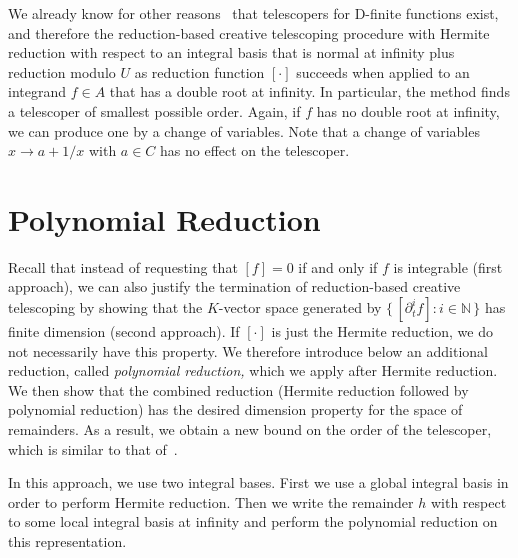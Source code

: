 \documentclass[final,1p,times,authoryear]{elsarticle}
\let\set\mathbb
\begin{document}
We already know for other reasons~\citep{Zeilberger1990,chyzak00} that
telescopers for D-finite functions exist, and therefore the reduction-based
creative telescoping procedure with Hermite reduction with respect to an
integral basis that is normal at infinity plus reduction modulo $U$
as reduction function $[\cdot]$ succeeds when applied to an integrand $f\in A$ that has a double root at infinity.
In particular, the method finds a telescoper of smallest possible order.
Again, if $f$ has no double root at infinity, we can produce one by a change of variables.
Note that a change of variables $x\to a+1/x$ with $a\in C$ has no effect on
the telescoper.

\section{Polynomial Reduction}\label{sec:polynomial}

Recall that instead of requesting that $[f]=0$ if and only if $f$ is integrable
(first approach), we can also justify the termination of reduction-based
creative telescoping by showing that the $K$-vector space generated by $\bigl\{\,[\partial_t^if]:i\in\set N\,\bigr\}$
has finite dimension (second approach). If $[\cdot]$ is just the Hermite
reduction, we do not necessarily have this property. We therefore introduce below an
additional reduction, called \emph{polynomial reduction,} which we apply after
Hermite reduction. We then show that the combined reduction (Hermite reduction
followed by polynomial reduction) has the desired dimension property for the
space of remainders. As a result, we obtain a new bound on the order of the
telescoper, which is similar to that of~\cite{chen14a}.

In this approach, we use two integral bases. First we use a global integral basis
in order to perform Hermite reduction. Then we write the
remainder $h$ with respect to some local integral basis at infinity and perform the
polynomial reduction on this representation.
\end{document}
